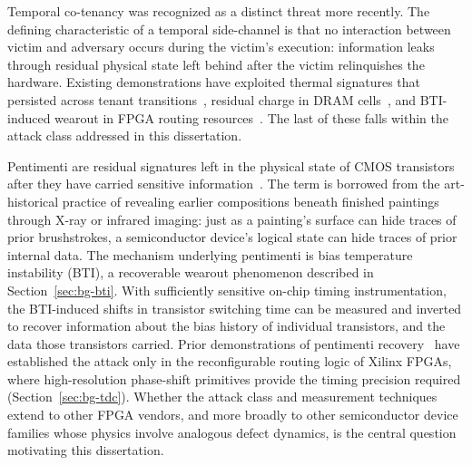 Temporal co-tenancy was recognized as a distinct threat more recently.
The defining characteristic of a temporal side-channel is that no
interaction between victim and adversary occurs during the victim's
execution: information leaks through residual physical state left behind
after the victim relinquishes the hardware. Existing demonstrations have
exploited thermal signatures that persisted across tenant
transitions~\cite{tian2019temporal}, residual charge in DRAM
cells~\cite{geist2020dram}, and BTI-induced wearout in FPGA routing
resources~\cite{drewes2024pentimento}. The last of these falls within
the attack class addressed in this dissertation.

Pentimenti are residual signatures left in the physical state of CMOS
transistors after they have carried sensitive
information~\cite{drewes2024pentimento}. The term is borrowed from the
art-historical practice of revealing earlier compositions beneath
finished paintings through X-ray or infrared imaging: just as a
painting's surface can hide traces of prior brushstrokes, a
semiconductor device's logical state can hide traces of prior internal
data. The mechanism underlying pentimenti is bias temperature
instability (BTI), a recoverable wearout phenomenon described in
Section~\ref{sec:bg-bti}. With sufficiently sensitive on-chip timing
instrumentation, the BTI-induced shifts in transistor switching time can
be measured and inverted to recover information about the bias history
of individual transistors, and the data those transistors carried. Prior
demonstrations of pentimenti recovery~\cite{drewes2024pentimento} have
established the attack only in the reconfigurable routing logic of
Xilinx FPGAs, where high-resolution phase-shift primitives provide the
timing precision required (Section~\ref{sec:bg-tdc}). Whether the attack
class and measurement techniques extend to other FPGA vendors, and more
broadly to other semiconductor device families whose physics involve
analogous defect dynamics, is the central question motivating this
dissertation.